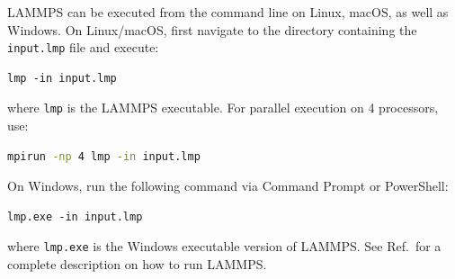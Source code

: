 \documentclass[9pt,tutorial]{livecoms}
\newcommand{\flecmd}[1]{\textcolor{command}{\texttt{#1}}} %
\begin{document}
\begin{appendices}
LAMMPS can be executed from the command line on Linux, macOS,
as well as Windows. On Linux/macOS, first navigate to the directory containing
the \flecmd{input.lmp} file and execute:
\begin{lstlisting}
lmp -in input.lmp
\end{lstlisting}
where \flecmd{lmp} is the LAMMPS executable.
For parallel execution on 4 processors, use:
\begin{lstlisting}[language=bash]
mpirun -np 4 lmp -in input.lmp
\end{lstlisting}
On Windows, run the following command via Command Prompt or PowerShell:
\begin{lstlisting}
lmp.exe -in input.lmp
\end{lstlisting}
where \flecmd{lmp.exe} is the Windows executable version of LAMMPS.  See
Ref.\, for a complete description on how to run
LAMMPS.

\end{appendices}
\end{document}
